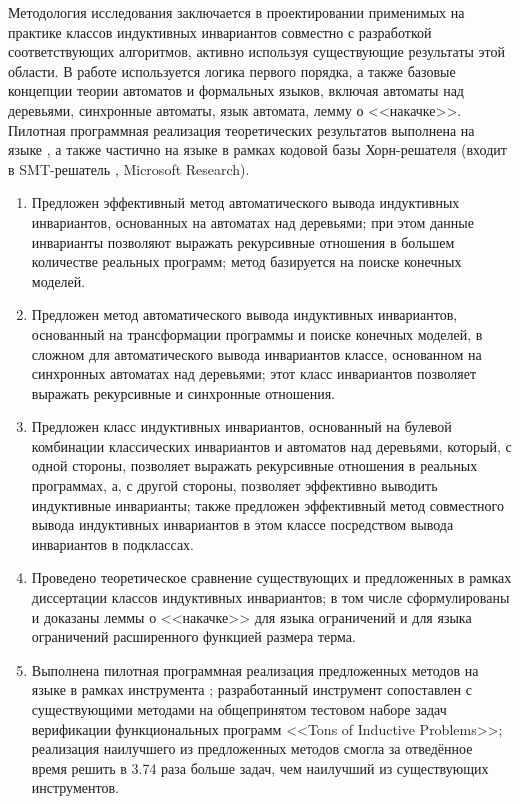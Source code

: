 {\methods}
Методология исследования заключается в проектировании применимых на практике классов индуктивных инвариантов совместно с разработкой соответствующих алгоритмов, активно используя существующие результаты этой области.
В работе используется логика первого порядка, а также базовые концепции теории автоматов и формальных языков, включая автоматы над деревьями, синхронные автоматы, язык автомата, лемму о <<накачке>>.
Пилотная программная реализация теоретических результатов выполнена на языке \fsharp{}, а также частично на языке \cplusplus{} в рамках кодовой базы Хорн-решателя \racer{} (входит в SMT-решатель \zprover{}, Microsoft Research).

{}
\begin{enumerate}[beginpenalty=10000] %
  \item Предложен эффективный метод автоматического вывода индуктивных инвариантов, основанных на автоматах над деревьями; при этом данные инварианты позволяют выражать рекурсивные отношения в большем количестве реальных программ; метод базируется на поиске конечных моделей.
  \item Предложен метод автоматического вывода индуктивных инвариантов, основанный на трансформации программы и поиске конечных моделей, в сложном для автоматического вывода инвариантов классе, основанном на синхронных автоматах над деревьями; этот класс инвариантов позволяет выражать рекурсивные и синхронные отношения.
  \item Предложен класс индуктивных инвариантов, основанный на булевой комбинации классических инвариантов и автоматов над деревьями, который, с одной стороны, позволяет выражать рекурсивные отношения в реальных программах, а, с другой стороны, позволяет эффективно выводить индуктивные инварианты; также предложен эффективный метод совместного вывода индуктивных инвариантов в этом классе посредством вывода инвариантов в подклассах.
  \item Проведено теоретическое сравнение существующих и предложенных в рамках диссертации классов индуктивных инвариантов; в том числе сформулированы и доказаны леммы о <<накачке>> для языка ограничений и для языка ограничений расширенного функцией размера терма.
  \item Выполнена пилотная программная реализация предложенных методов на языке \fsharp{} в рамках инструмента \theringen{}; разработанный инструмент сопоставлен с существующими методами на общепринятом тестовом наборе задач верификации функциональных программ <<Tons of Inductive Problems>>; реализация наилучшего из предложенных методов смогла за отведённое время решить в 3.74 раза больше задач, чем наилучший из существующих инструментов.
\end{enumerate}

